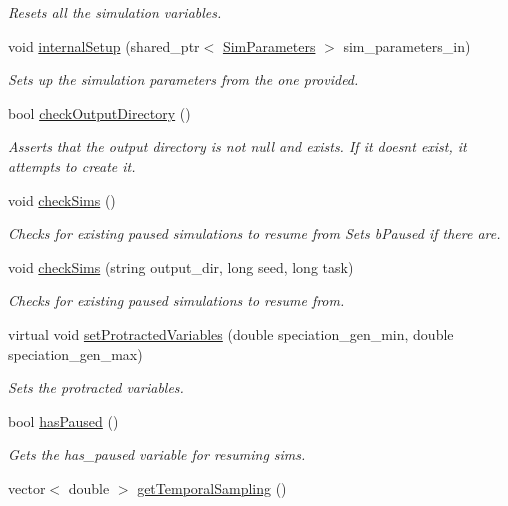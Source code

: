 \begin{DoxyCompactItemize}
\begin{DoxyCompactList}\small\item\em Resets all the simulation variables. \end{DoxyCompactList}\item 
void \hyperlink{class_tree_a9bbc17547248e676085fab58ab2022e7}{internal\+Setup} (shared\+\_\+ptr$<$ \hyperlink{struct_sim_parameters}{Sim\+Parameters} $>$ sim\+\_\+parameters\+\_\+in)
\begin{DoxyCompactList}\small\item\em Sets up the simulation parameters from the one provided. \end{DoxyCompactList}\item 
bool \hyperlink{class_tree_a5c6065ede9862e9fb6561eb8beaf5d78}{check\+Output\+Directory} ()
\begin{DoxyCompactList}\small\item\em Asserts that the output directory is not null and exists. If it doesn\textquotesingle{}t exist, it attempts to create it. \end{DoxyCompactList}\item 
void \hyperlink{class_tree_ad0bcc474a9ab1d4e3e2458c4de7304ad}{check\+Sims} ()
\begin{DoxyCompactList}\small\item\em Checks for existing paused simulations to resume from Sets b\+Paused if there are. \end{DoxyCompactList}\item 
void \hyperlink{class_tree_aafaede1da6c79583bf2e28b7a1881a5c}{check\+Sims} (string output\+\_\+dir, long seed, long task)
\begin{DoxyCompactList}\small\item\em Checks for existing paused simulations to resume from. \end{DoxyCompactList}\item 
virtual void \hyperlink{class_tree_a891764ffc1e29d3edbe0fd08e67a184b}{set\+Protracted\+Variables} (double speciation\+\_\+gen\+\_\+min, double speciation\+\_\+gen\+\_\+max)
\begin{DoxyCompactList}\small\item\em Sets the protracted variables. \end{DoxyCompactList}\item 
bool \hyperlink{class_tree_ae07761c0a91a44ebe459904b1b8ffb43}{has\+Paused} ()
\begin{DoxyCompactList}\small\item\em Gets the has\+\_\+paused variable for resuming sims. \end{DoxyCompactList}\item 
vector$<$ double $>$ \hyperlink{class_tree_ac03c034a5730ee4f4d8727aace776412}{get\+Temporal\+Sampling} ()\hypertarget{class_tree_ac03c034a5730ee4f4d8727aace776412}{}\label{class_tree_ac03c034a5730ee4f4d8727aace776412}


\end{DoxyCompactItemize}
